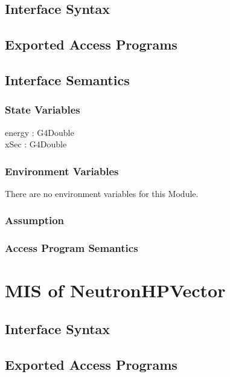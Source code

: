 \documentclass[12pt]{article}
\begin{document}
\subsection{Interface Syntax}%

\subsection{Exported Access Programs}%

\subsection{Interface Semantics}

\subsubsection{State Variables}%
energy : G4Double\\
xSec    : G4Double

\subsubsection{Environment Variables}%
There are no environment variables for this Module.

\subsubsection{Assumption}%

\subsubsection{Access Program Semantics}%


\section{MIS of NeutronHPVector}

\subsection{Interface Syntax}%

\subsection{Exported Access Programs}%
\end{document}
